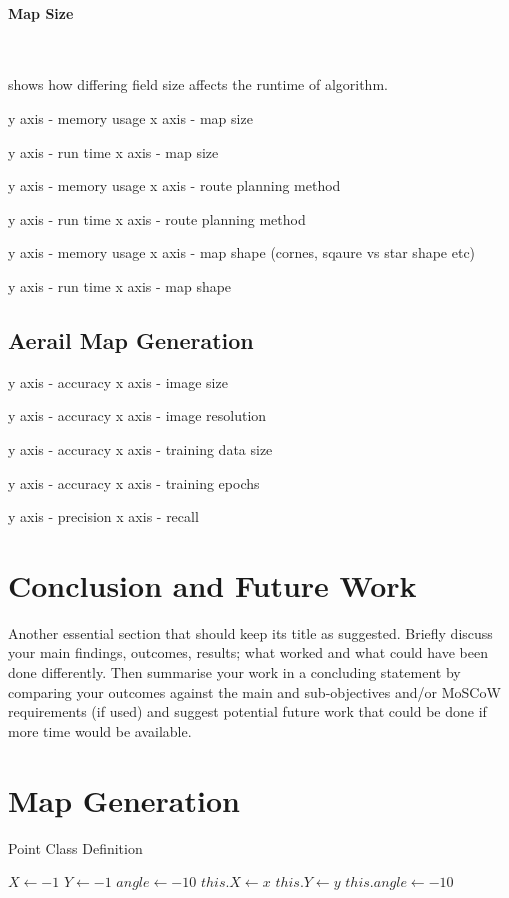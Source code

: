 \documentclass[final]{cmpreport_02}
\begin{document}
\paragraph{Map Size} \

 shows how differing field size affects the runtime of algorithm.


y axis - memory usage
x axis - map size


y axis - run time
x axis - map size

y axis - memory usage
x axis - route planning method

y axis - run time
x axis - route planning method

y axis - memory usage
x axis - map shape (cornes, sqaure vs star shape etc)

y axis - run time
x axis - map shape

\subsection{Aerail Map Generation}

y axis - accuracy
x axis - image size

y axis - accuracy
x axis - image resolution

y axis - accuracy
x axis - training data size

y axis - accuracy
x axis - training epochs

y axis - precision
x axis - recall
\section{Conclusion and Future Work}


Another essential section that should keep its title as suggested. Briefly discuss your main findings, outcomes, results; what worked and what could have been done differently. Then summarise your work in a concluding statement by comparing your outcomes against the main and sub-objectives and/or MoSCoW requirements (if used) and suggest potential future work that could be done if more time would be available.


\clearpage



\appendix
\clearpage

\section{Map Generation}

\begin{algorithm}[h!]
	\caption{Point Class Definition}
	\label{mg:point class}
	\begin{algorithmic}[1]
		\State $X \gets -1$ 
		\State $Y \gets -1$ 
		\State $angle \gets -10$ 
		\State $this.X \gets x$
		\State $this.Y \gets y$
		\State $this.angle \gets -10$ 
		\EndProcedure
		\EndProcedure
	\end{algorithmic}
\end{algorithm}
\end{document}
